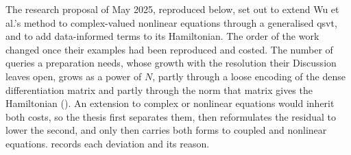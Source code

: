 The research proposal of May 2025, reproduced below, set out to extend Wu et al.'s method to complex-valued nonlinear equations through a generalised \gls{qsvt}, and to add data-informed terms to its Hamiltonian. The order of the work changed once their examples had been reproduced and costed. The number of queries a preparation needs, whose growth with the resolution their Discussion leaves open, grows as a power of $N$, partly through a loose encoding of the dense differentiation matrix and partly through the norm that matrix gives the Hamiltonian (). An extension to complex or nonlinear equations would inherit both costs, so the thesis first separates them, then reformulates the residual to lower the second, and only then carries both forms to coupled and nonlinear equations.  records each deviation and its reason.

